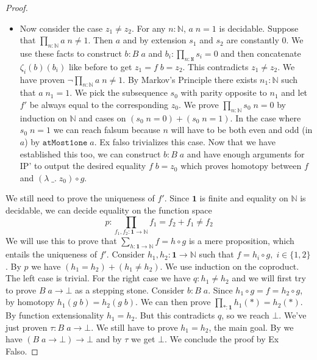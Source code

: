 \documentclass[12pt]{report}
\theoremstyle{definition}
\begin{document}
\begin{proof}
\begin{itemize}
\item Now consider the case $z_1 \neq z_2$. 
For any $n : \mathbb{N}$, $a\; n = 1$ is decidable. 
Suppose that $\prod_{n : 
\mathbb{N}} a\; n \neq 1$. 
Then $a$ and by extension $s_1$ and $s_2$ are constantly $0$. 
We use these facts to construct $b : B\;a$ and $b_i : \prod_{n : \mathtt{N}}s_i = 0$ and then concatenate $\zeta_i(b)(b_i)$ like before to get $z_1 = f\; b = z_2$. 
This contradicts $z_1 \neq z_2$. 
We have proven $\neg \prod_{n : 
\mathbb{N}} a\; n \neq 1$. 
By Markov's Principle there exists $n_1 : \mathbb{N}$ such that $a\; n_1 = 1$. 
We pick the subsequence $s_0$ with parity opposite to $n_1$ and let $f'$ be always equal to the corresponding $z_0$. 
We prove $\prod_{n : \mathbb{N}} s_0\; n = 0$ by induction on $\mathbb{N}$ and cases on $(s_0 \;n = 0) + (s_0\;n = 1)$. 
In the case where $s_0\; n = 1$ we can reach falsum because $n$ will have to be both even and odd (in $a$) by $\mathtt{atMost1one} \; a$. Ex falso trivializes this case. 
Now that we have established this too, we can construct $b : B\; a$ and have enough arguments for IP' to output the desired equality $f\; b = z_0$ which proves homotopy between $f$ and $(\lambda\;\_.\; z_0) \circ g$.
\end{itemize}
We still need to prove the uniqueness of $f'$. 
Since $\mathbf{1}$ is finite and equality on $\mathbb{N}$ is decidable, we can decide equality on the function space 
$$p : \prod_{f_1,f_2 : \mathbf{1}\rightarrow \mathbb{N}} f_1 = f_2 + f_1 \neq f_2$$
We will use this to prove that $\sum_{h : \mathbf{1}\rightarrow \mathbb{N}} f= h \circ g$ is a mere proposition, which entails the uniqueness of $f'$. 
Consider $h_1,h_2 : \mathbf{1}\rightarrow \mathbb{N}$ such that $f= h_i \circ g,\; i \in \{1,2\}$. 
By $p$ we have $(h_1 = h_2) + (h_1 \neq h_2)$. 
We use induction on the coproduct. 
The left case is trivial. 
For the right case we have $q : h_1 \neq h_2$ and we will first try to prove $B\; a \rightarrow \bot$ as a stepping stone. 
Consider $b : B\; a$. 
Since $h_1 \circ g = f = h_2 \circ g$, by homotopy $h_1 (g\; b) = h_2 (g\; b)$. 
We can then prove $\prod_{*: \mathbf{1}} h_1 (*) = h_2 (*)$. 
By function extensionality $h_1 = h_2$. 
But this contradicts $q$, so we reach $\bot$. 
We've just proven $\tau : B\;a \rightarrow \bot$. 
We still have to prove $h_1 = h_2$, the main goal. 
By  we have $(B\; a \rightarrow \bot) \rightarrow \bot$ and by $\tau$ we get $\bot$. 
We conclude the proof by Ex Falso.
\end{proof}
\end{document}
